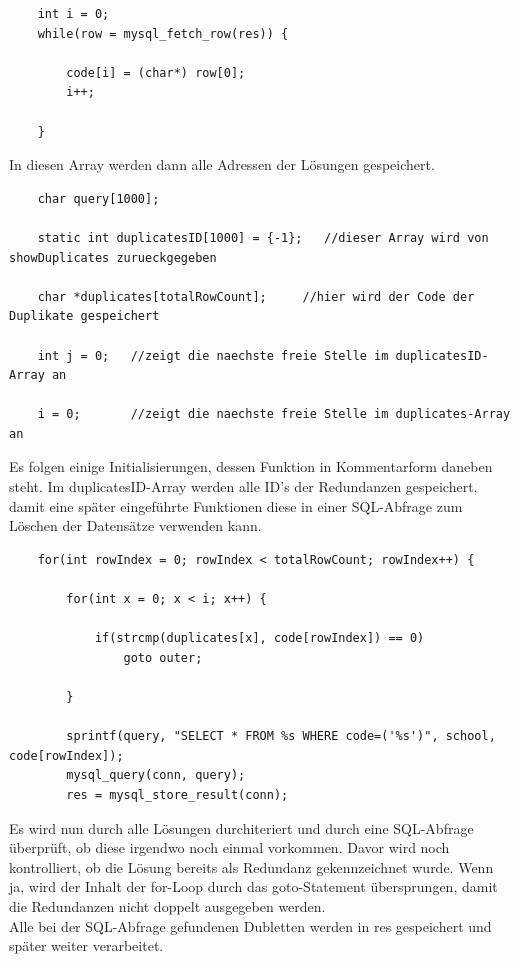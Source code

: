 \documentclass[12pt]{report}
\begin{document}
\begin{lstlisting}
    int i = 0;
    while(row = mysql_fetch_row(res)) {

        code[i] = (char*) row[0];
        i++;

    }
\end{lstlisting}


\noindent In diesen Array werden dann alle Adressen der Lösungen gespeichert.\\

\begin{lstlisting}
    char query[1000];
    
    static int duplicatesID[1000] = {-1};   //dieser Array wird von showDuplicates zurueckgegeben
    
    char *duplicates[totalRowCount];     //hier wird der Code der Duplikate gespeichert
    
    int j = 0;   //zeigt die naechste freie Stelle im duplicatesID-Array an
    
    i = 0;       //zeigt die naechste freie Stelle im duplicates-Array an

\end{lstlisting}

\noindent Es folgen einige Initialisierungen, dessen Funktion in Kommentarform daneben steht. Im duplicatesID-Array werden alle ID's der Redundanzen gespeichert, damit eine später eingeführte Funktionen diese in einer SQL-Abfrage zum Löschen der Datensätze verwenden kann.\\


\begin{lstlisting}
    for(int rowIndex = 0; rowIndex < totalRowCount; rowIndex++) {

        for(int x = 0; x < i; x++) {

            if(strcmp(duplicates[x], code[rowIndex]) == 0)
                goto outer;

        }

        sprintf(query, "SELECT * FROM %s WHERE code=('%s')", school, code[rowIndex]);
        mysql_query(conn, query);
        res = mysql_store_result(conn);
\end{lstlisting}

\noindent Es wird nun durch alle Lösungen durchiteriert und durch eine SQL-Abfrage überprüft, ob diese irgendwo noch einmal vorkommen. Davor wird noch kontrolliert, ob die Lösung bereits als Redundanz gekennzeichnet wurde. Wenn ja, wird der Inhalt der for-Loop durch das goto-Statement übersprungen, damit die Redundanzen nicht doppelt ausgegeben werden.\\
Alle bei der SQL-Abfrage gefundenen Dubletten werden in res gespeichert und später weiter verarbeitet.\\
\end{document}
